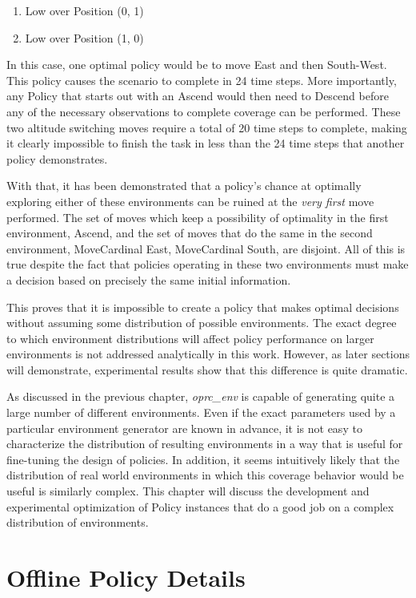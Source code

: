 \begin{enumerate}
	\item Low over Position (0, 1)
	\item Low over Position (1, 0)
\end{enumerate}

In this case, one optimal policy would be to move East and then South-West. This policy causes the scenario to complete in 24 time steps. More importantly, any Policy that starts out with an Ascend would then need to Descend before any of the necessary observations to complete coverage can be performed. These two altitude switching moves require a total of 20 time steps to complete, making it clearly impossible to finish the task in less than the 24 time steps that another policy demonstrates. 

With that, it has been demonstrated that a policy's chance at optimally exploring either of these environments can be ruined at the \textit{very first} move performed. The set of moves which keep a possibility of optimality in the first environment, {Ascend}, and the set of moves that do the same in the second environment, {MoveCardinal East, MoveCardinal South}, are disjoint. All of this is true despite the fact that policies operating in these two environments must make a decision based on precisely the same initial information.

This proves that it is impossible to create a policy that makes optimal decisions without assuming some distribution of possible environments. The exact degree to which environment distributions will affect policy performance on larger environments is not addressed analytically in this work. However, as later sections will demonstrate, experimental results show that this difference is quite dramatic.

As discussed in the previous chapter, \textit{oprc\_env} is capable of generating quite a large number of different environments. Even if the exact parameters used by a particular environment generator are known in advance, it is not easy to characterize the distribution of resulting environments in a way that is useful for fine-tuning the design of policies. In addition, it seems intuitively likely that the distribution of real world environments in which this coverage behavior would be useful is similarly complex. This chapter will discuss the development and experimental optimization of Policy instances that do a good job on a complex distribution of environments.

\section{Offline Policy Details}

